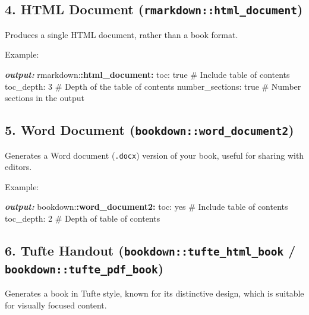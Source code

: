 \documentclass[
]{book}
\newenvironment{Shaded}{\begin{snugshade}}{\end{snugshade}}
\newcommand{\AnnotationTok}[1]{\textcolor[rgb]{0.56,0.35,0.01}{\textbf{\textit{#1}}}}
\newcommand{\NormalTok}[1]{#1}
\newcommand{\SpecialCharTok}[1]{\textcolor[rgb]{0.81,0.36,0.00}{\textbf{#1}}}
\theoremstyle{definition}
\theoremstyle{definition}
\theoremstyle{definition}
\theoremstyle{definition}
\theoremstyle{remark}
\begin{document}
\subsection{\texorpdfstring{4. HTML Document (\texttt{rmarkdown::html\_document})}{4. HTML Document (rmarkdown::html\_document)}}\label{html-document-rmarkdownhtml_document}

Produces a single HTML document, rather than a book format.

Example:

\begin{Shaded}
\begin{Highlighting}[]
\AnnotationTok{output:}
\NormalTok{  rmarkdown:}\SpecialCharTok{:html\_document:}
\NormalTok{    toc: true  \# Include table of contents}
\NormalTok{    toc\_depth: 3  \# Depth of the table of contents}
\NormalTok{    number\_sections: true  \# Number sections in the output}
\end{Highlighting}
\end{Shaded}

\subsection{\texorpdfstring{5. Word Document (\texttt{bookdown::word\_document2})}{5. Word Document (bookdown::word\_document2)}}\label{word-document-bookdownword_document2}

Generates a Word document (\texttt{.docx}) version of your book, useful for sharing with editors.

Example:

\begin{Shaded}
\begin{Highlighting}[]
\AnnotationTok{output:}
\NormalTok{  bookdown:}\SpecialCharTok{:word\_document2:}
\NormalTok{    toc: yes  \# Include table of contents}
\NormalTok{    toc\_depth: 2  \# Depth of table of contents}
\end{Highlighting}
\end{Shaded}

\subsection{\texorpdfstring{6. Tufte Handout (\texttt{bookdown::tufte\_html\_book} / \texttt{bookdown::tufte\_pdf\_book})}{6. Tufte Handout (bookdown::tufte\_html\_book / bookdown::tufte\_pdf\_book)}}\label{tufte-handout-bookdowntufte_html_book-bookdowntufte_pdf_book}

Generates a book in Tufte style, known for its distinctive design, which is suitable for visually focused content.
\end{document}
